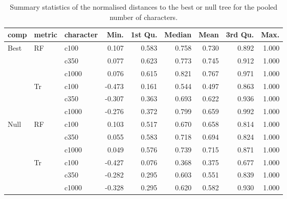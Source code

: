 \begin{table}[ht]
\centering
\begin{tabular}{lllrrrrrr}
  \hline
comp & metric & character & Min. & 1st Qu. & Median & Mean & 3rd Qu. & Max. \\ 
  \hline
Best & RF & c100 & 0.107 & 0.583 & 0.758 & 0.730 & 0.892 & 1.000 \\ 
   &  & c350 & 0.077 & 0.623 & 0.773 & 0.745 & 0.912 & 1.000 \\ 
   &  & c1000 & 0.076 & 0.615 & 0.821 & 0.767 & 0.971 & 1.000 \\ 
   & Tr & c100 & -0.473 & 0.161 & 0.544 & 0.497 & 0.863 & 1.000 \\ 
   &  & c350 & -0.307 & 0.363 & 0.693 & 0.622 & 0.936 & 1.000 \\ 
   &  & c1000 & -0.276 & 0.372 & 0.799 & 0.659 & 0.992 & 1.000 \\ 
  Null & RF & c100 & 0.103 & 0.517 & 0.670 & 0.658 & 0.814 & 1.000 \\ 
   &  & c350 & 0.055 & 0.583 & 0.718 & 0.694 & 0.824 & 1.000 \\ 
   &  & c1000 & 0.049 & 0.576 & 0.739 & 0.715 & 0.871 & 1.000 \\ 
   & Tr & c100 & -0.427 & 0.076 & 0.368 & 0.375 & 0.677 & 1.000 \\ 
   &  & c350 & -0.282 & 0.295 & 0.603 & 0.551 & 0.839 & 1.000 \\ 
   &  & c1000 & -0.328 & 0.295 & 0.620 & 0.582 & 0.930 & 1.000 \\ 
   \hline
\end{tabular}
\caption{Summary statistics of the normalised distances to the best or null tree for the pooled number of characters.} 
\label{Full_Tab_pooledcharacters}
\end{table}
